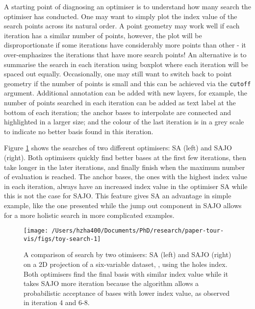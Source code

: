 A starting point of diagnosing an optimiser is to understand how many
search the optimiser has conducted. One may want to simply plot the
index value of the search points across its natural order. A point
geometry may work well if each iteration has a similar number of points,
however, the plot will be disproportionate if some iterations have
considerably more points than other - it over-emphasizes the iterations
that have more search points! An alternative is to summarise the search
in each iteration using boxplot where each iteration will be spaced out
equally. Occasionally, one may still want to switch back to point
geometry if the number of points is small and this can be achieved via
the \texttt{cutoff} argument. Additional annotation can be added with
new layers, for example, the number of points searched in each iteration
can be added as text label at the bottom of each iteration; the anchor
bases to interpolate are connected and highlighted in a larger size; and
the colour of the last iteration is in a grey scale to indicate no
better basis found in this iteration.

Figure \ref{fig:toy-search} shows the searches of two different
optimisers: SA (left) and SAJO (right). Both optimisers quickly find
better bases at the first few iterations, then take longer in the later
iterations, and finally finish when the maximum number of evaluation is
reached. The anchor bases, the ones with the highest index value in each
iteration, always have an increased index value in the optimiser SA
while this is not the case for SAJO. This feature gives SA an advantage
in simple example, like the one presented while the jump out component
in SAJO allows for a more holistic search in more complicated examples.

\begin{Schunk}
\begin{figure}
\texttt{[image: /Users/hzha400/Documents/PhD/research/paper-tour-vis/figs/toy-search-1]} \caption[A comparison of search by two otimisers]{A comparison of search by two otimisers: SA (left) and SAJO (right) on a 2D projection of a six-variable dataset, , using the holes index. Both optimisers find the final basis with similar index value while it takes SAJO more iteration because the algorithm allows a probabilistic acceptance of bases with lower index value, as observed in iteration 4 and 6-8.}\label{fig:toy-search}
\end{figure}
\end{Schunk}

